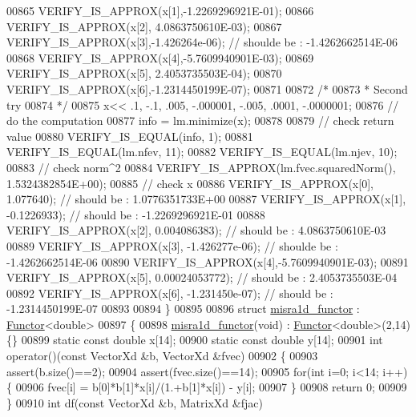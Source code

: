 \begin{DoxyCode}
00865   VERIFY\_IS\_APPROX(x[1],-1.2269296921E-01);
00866   VERIFY\_IS\_APPROX(x[2], 4.0863750610E-03);
00867   VERIFY\_IS\_APPROX(x[3],-1.426264e-06); \textcolor{comment}{// shoulde be : -1.4262662514E-06}
00868   VERIFY\_IS\_APPROX(x[4],-5.7609940901E-03);
00869   VERIFY\_IS\_APPROX(x[5], 2.4053735503E-04);
00870   VERIFY\_IS\_APPROX(x[6],-1.2314450199E-07);
00871 
00872   \textcolor{comment}{/*}
00873 \textcolor{comment}{   * Second try}
00874 \textcolor{comment}{   */}
00875   x<< .1, -.1, .005, -.000001, -.005, .0001, -.0000001;
00876   \textcolor{comment}{// do the computation}
00877   info = lm.minimize(x);
00878 
00879   \textcolor{comment}{// check return value}
00880   VERIFY\_IS\_EQUAL(info, 1);
00881   VERIFY\_IS\_EQUAL(lm.nfev, 11);
00882   VERIFY\_IS\_EQUAL(lm.njev, 10);
00883   \textcolor{comment}{// check norm^2}
00884   VERIFY\_IS\_APPROX(lm.fvec.squaredNorm(), 1.5324382854E+00);
00885   \textcolor{comment}{// check x}
00886   VERIFY\_IS\_APPROX(x[0], 1.077640); \textcolor{comment}{// should be :  1.0776351733E+00}
00887   VERIFY\_IS\_APPROX(x[1], -0.1226933); \textcolor{comment}{// should be : -1.2269296921E-01}
00888   VERIFY\_IS\_APPROX(x[2], 0.004086383); \textcolor{comment}{// should be : 4.0863750610E-03}
00889   VERIFY\_IS\_APPROX(x[3], -1.426277e-06); \textcolor{comment}{// shoulde be : -1.4262662514E-06}
00890   VERIFY\_IS\_APPROX(x[4],-5.7609940901E-03);
00891   VERIFY\_IS\_APPROX(x[5], 0.00024053772); \textcolor{comment}{// should be : 2.4053735503E-04}
00892   VERIFY\_IS\_APPROX(x[6], -1.231450e-07); \textcolor{comment}{// should be : -1.2314450199E-07}
00893 
00894 \}
00895 
00896 \textcolor{keyword}{struct }\hyperlink{structmisra1d__functor}{misra1d\_functor} : \hyperlink{struct_functor}{Functor}<double>
00897 \{
00898     \hyperlink{structmisra1d__functor}{misra1d\_functor}(\textcolor{keywordtype}{void}) : \hyperlink{struct_functor}{Functor}<double>(2,14) \{\}
00899     \textcolor{keyword}{static} \textcolor{keyword}{const} \textcolor{keywordtype}{double} x[14];
00900     \textcolor{keyword}{static} \textcolor{keyword}{const} \textcolor{keywordtype}{double} y[14];
00901     \textcolor{keywordtype}{int} operator()(\textcolor{keyword}{const} VectorXd &b, VectorXd &fvec)
00902     \{
00903         assert(b.size()==2);
00904         assert(fvec.size()==14);
00905         \textcolor{keywordflow}{for}(\textcolor{keywordtype}{int} i=0; i<14; i++) \{
00906             fvec[i] = b[0]*b[1]*x[i]/(1.+b[1]*x[i]) - y[i];
00907         \}
00908         \textcolor{keywordflow}{return} 0;
00909     \}
00910     \textcolor{keywordtype}{int} df(\textcolor{keyword}{const} VectorXd &b, MatrixXd &fjac)

\end{DoxyCode}

